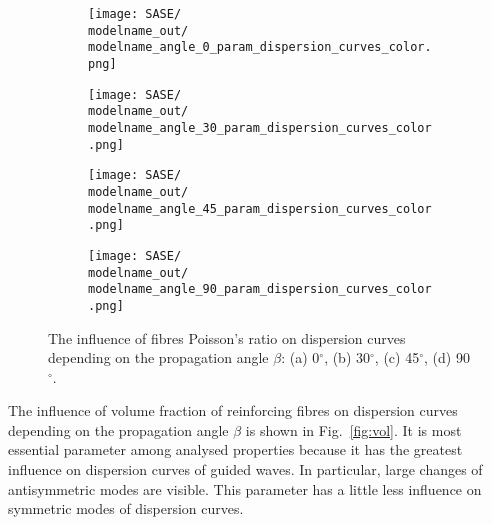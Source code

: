\documentclass[preprint,12pt]{elsarticle}
\begin{document}
\begin{figure} [h!]
	\centering
	\newcommand{\modelname}{SASE7}
	\begin{subfigure}[b]{0.49\textwidth}
		\centering
		\texttt{[image: SASE/\\modelname\_out/\\modelname\_angle\_0\_param\_dispersion\_curves\_color.png]}
		\caption{}
		\label{fig:nif0}
	\end{subfigure}
	\hfill
	\begin{subfigure}[b]{0.49\textwidth}
		\centering
		\texttt{[image: SASE/\\modelname\_out/\\modelname\_angle\_30\_param\_dispersion\_curves\_color.png]}
		\caption{}
		\label{fig:nif30}
	\end{subfigure}
	\begin{subfigure}[b]{0.49\textwidth}
		\centering
		\texttt{[image: SASE/\\modelname\_out/\\modelname\_angle\_45\_param\_dispersion\_curves\_color.png]}
		\caption{}
		\label{fig:nif45}
	\end{subfigure}
	\hfill
	\begin{subfigure}[b]{0.49\textwidth}
		\centering
		\texttt{[image: SASE/\\modelname\_out/\\modelname\_angle\_90\_param\_dispersion\_curves\_color.png]}
		\caption{}
		\label{fig:nif90}
	\end{subfigure}
	\caption{The influence of fibres Poisson's ratio on dispersion curves depending on the propagation angle $\beta$: (a) 0$^{\circ}$, (b) 30$^{\circ}$, (c) 45$^{\circ}$, (d) 90$^{\circ}$.} 
	\label{fig:nif}
\end{figure}
\clearpage

The influence of volume fraction of reinforcing fibres on dispersion curves depending on the propagation angle $\beta$ is shown in Fig.~\ref{fig:vol}. It is most essential parameter among analysed properties because it has the greatest influence on dispersion curves of guided waves. In particular, large changes of antisymmetric modes are visible. This parameter has a little less influence on symmetric modes of dispersion curves. 
\end{document}
